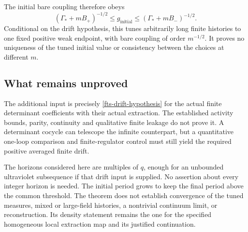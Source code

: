 The initial bare coupling therefore obeys
\begin{equation}
 (\Gamma_*+mB_+)^{-1/2}
       \leq g_{\mathrm{initial}}
       \leq(\Gamma_*+mB_-)^{-1/2}.
 \label{fts-bare-coupling-bounds}
\end{equation}
Conditional on the drift hypothesis, this tunes arbitrarily
long finite histories to one fixed positive weak endpoint,
with bare coupling of order $m^{-1/2}$. It proves no
uniqueness of the tuned initial value or consistency between
the choices at different $m$.

\subsection{What remains unproved}
\label{fts-scope-section}

The additional input is precisely
\eqref{fts-drift-hypothesis} for the actual finite
determinant coefficients with their actual extraction.
The established activity bounds, parity, continuity and
qualitative finite leakage do not prove it. A determinant
cocycle can telescope the infinite counterpart, but a
quantitative one-loop comparison and finite-regulator
control must still yield the required positive averaged
finite drift.

The horizons considered here are multiples of $q$, enough
for an unbounded ultraviolet subsequence if that drift
input is supplied. No assertion about every integer
horizon is needed. The initial period grows to keep the
final period above the common threshold. The theorem
does not establish convergence of the tuned measures,
mixed or large-field histories, a nontrivial continuum
limit, or reconstruction. Its density statement remains
the one for the specified homogeneous local extraction
map and its justified continuation.
